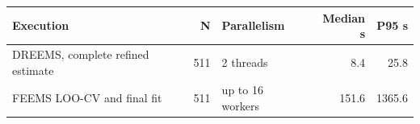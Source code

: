 \begin{tabular}{lrlrr}
\toprule
Execution & N & Parallelism & Median s & P95 s \\
\midrule
DREEMS, complete refined estimate & 511 & 2 threads & 8.4 & 25.8 \\
FEEMS LOO-CV and final fit & 511 & up to 16 workers & 151.6 & 1365.6 \\
\bottomrule
\end{tabular}
